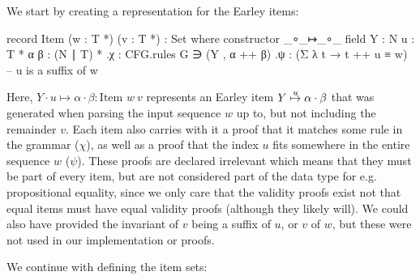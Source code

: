 		We start by creating a representation for the Earley items:

		\begin{code}
			  record Item (w : T *) (v : T *) : Set where
			    constructor _∘_↦_∘_
			    field
			      Y : N
			      u : T *
			      α β : (N ∣ T) *
			      .{χ} : CFG.rules G ∋ (Y , α ++ β)
			      .{ψ} : (Σ λ t → t ++ u ≡ w)        -- u is a suffix of w
		\end{code}

		Here, $Y \cdot u \mapsto \alpha \cdot \beta : \textrm{Item } w\ v$
		represents an Earley item $Y\overset{u}{\mapsto}\alpha\cdot\beta$ that was
		generated when parsing the input sequence $w$ up to, but not including
		the remainder $v$. Each item also carries with it a proof that it
		matches some rule in the grammar ($\chi$), as well as a proof that the
		index $u$ fits somewhere in the entire sequence $w$ ($\psi$). These
		proofs are declared irrelevant which means that they must be part of
		every item, but are not considered part of the data type for e.g.
		propositional equality, since we only care that the validity proofs
		exist not that equal items must have equal validity proofs (although
		they likely will). We could also have provided the invariant of $v$
		being a suffix of $u$, or $v$ of $w$, but these were not used in our
		implementation or proofs.


		We continue with defining the item sets:

